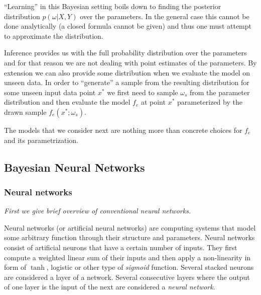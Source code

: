 \documentclass[12pt,a4paper,twoside]{scrartcl}
\numberwithin{equation}{section}
\begin{document}
``Learning'' in this Bayesian setting boils down to finding the posterior distribution \(p(\omega |X, Y)\) over the parameters. In the general case this cannot be done analytically (a closed formula cannot be given) and thus one must attempt to approximate the distribution.

Inference provides us with the full probability distribution over the parameters and for that reason we are not dealing with point estimates of the parameters. By extension we can also provide some distribution when we evaluate the model on unseen data. In order to ``generate'' a sample from the resulting distribution for some unseen input data point \(x^*\) we first need to sample \(\omega_s\) from the parameter distribution and then evaluate the model \(f_e\) at point \(x^*\) parameterized by the drawn sample \(f_e(x^*; \omega_s)\).

The models that we consider next are nothing more than concrete choices for \(f_e\) and its parametrization.
\subsection{Bayesian Neural Networks}\label{sec:bnn}
\subsubsection{Neural networks}\label{sec:nn}
\noindent\emph{First we give brief overview of conventional neural networks.}

Neural networks (or artificial neural networks) are computing systems that model some arbitrary function through their structure and parameters. Neural networks consist of artificial neurons that have a certain number of inputs. They first compute a weighted linear sum of their inputs and then apply a non-linearity in form of \(\tanh\), logistic or other type of \emph{sigmoid} function. Several stacked neurons are considered a layer of a network. Several consecutive layers where the output of one layer is the input of the next are considered a \emph{neural network}.
\end{document}
